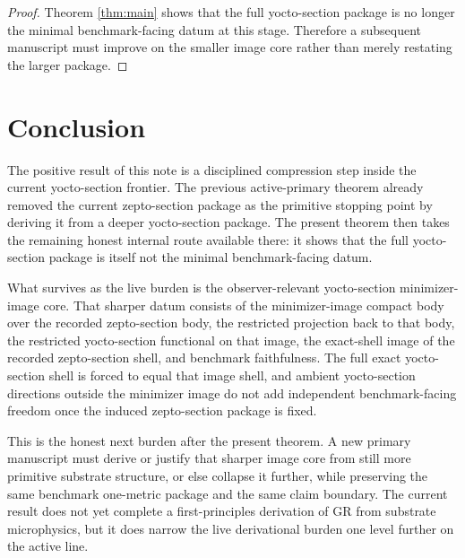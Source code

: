\documentclass[11pt]{article}
\begin{document}
\begin{proof}
Theorem \ref{thm:main} shows that the full yocto-section package is no longer the minimal benchmark-facing datum at this stage. Therefore a subsequent manuscript must improve on the smaller image core rather than merely restating the larger package.
\end{proof}

\section{Conclusion}

The positive result of this note is a disciplined compression step inside the current yocto-section frontier. The previous active-primary theorem already removed the current zepto-section package as the primitive stopping point by deriving it from a deeper yocto-section package. The present theorem then takes the remaining honest internal route available there: it shows that the full yocto-section package is itself not the minimal benchmark-facing datum.

What survives as the live burden is the observer-relevant yocto-section minimizer-image core. That sharper datum consists of the minimizer-image compact body over the recorded zepto-section body, the restricted projection back to that body, the restricted yocto-section functional on that image, the exact-shell image of the recorded zepto-section shell, and benchmark faithfulness. The full exact yocto-section shell is forced to equal that image shell, and ambient yocto-section directions outside the minimizer image do not add independent benchmark-facing freedom once the induced zepto-section package is fixed.

This is the honest next burden after the present theorem. A new primary manuscript must derive or justify that sharper image core from still more primitive substrate structure, or else collapse it further, while preserving the same benchmark one-metric package and the same claim boundary. The current result does not yet complete a first-principles derivation of GR from substrate microphysics, but it does narrow the live derivational burden one level further on the active line.
\end{document}

